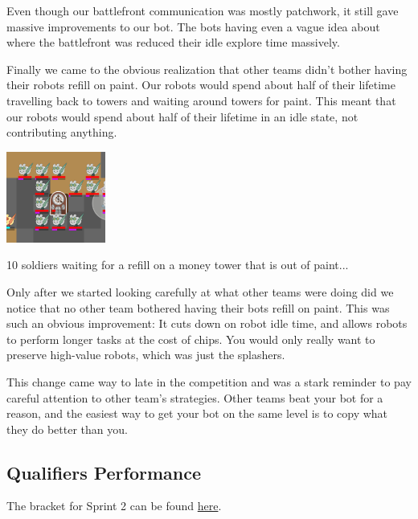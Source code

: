 \medskip

Even though our battlefront communication was mostly patchwork, it still gave massive improvements to our bot. The bots having even a vague idea about where the battlefront was reduced their idle explore time massively.

\medskip

Finally we came to the obvious realization that other teams didn't bother having their robots refill on paint. Our robots would spend about half of their lifetime travelling back to towers and waiting around towers for paint. This meant that our robots would spend about half of their lifetime in an idle state, not contributing anything.

\begin{center}
    \includegraphics[scale=0.1]{images/waiting_for_refill.png}
    \caption{10 soldiers waiting for a refill on a money tower that is out of paint...}
\end{center}

\medskip

Only after we started looking carefully at what other teams were doing did we notice that no other team bothered having their bots refill on paint. This was such an obvious improvement: It cuts down on robot idle time, and allows robots to perform longer tasks at the cost of chips. You would only really want to preserve high-value robots, which was just the splashers.

\medskip

This change came way to late in the competition and was a stark reminder to pay careful attention to other team's strategies. Other teams beat your bot for a reason, and the easiest way to get your bot on the same level is to copy what they do better than you.

\subsection{Qualifiers Performance}

The bracket for Sprint 2 can be found \href{https://challonge.com/bc25javausquals}{here}.

\medskip

